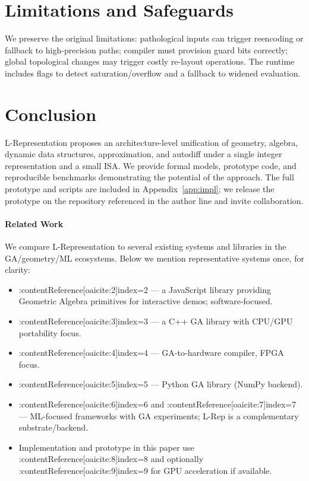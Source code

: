 \documentclass[11pt]{article}
\theoremstyle{definition}
\theoremstyle{plain}
\begin{document}
\section{Limitations and Safeguards}
We preserve the original limitations: pathological inputs can trigger reencoding or fallback to high-precision paths; compiler must provision guard bits correctly; global topological changes may trigger costly re-layout operations. The runtime includes flags to detect saturation/overflow and a fallback to widened evaluation.

\section{Conclusion}
L-Representation proposes an architecture-level unification of geometry, algebra, dynamic data structures, approximation, and autodiff under a single integer representation and a small ISA. We provide formal models, prototype code, and reproducible benchmarks demonstrating the potential of the approach. The full prototype and scripts are included in Appendix~\ref{app:impl}; we release the prototype on the repository referenced in the author line and invite collaboration.

\paragraph{Related Work}
We compare L-Representation to several existing systems and libraries in the GA/geometry/ML ecosystems. Below we mention representative systems once, for clarity:

\begin{itemize}
  \item :contentReference[oaicite:2]{index=2} — a JavaScript library providing Geometric Algebra primitives for interactive demos; software-focused.
  \item :contentReference[oaicite:3]{index=3} — a C++ GA library with CPU/GPU portability focus.
  \item :contentReference[oaicite:4]{index=4} — GA-to-hardware compiler, FPGA focus.
  \item :contentReference[oaicite:5]{index=5} — Python GA library (NumPy backend).
  \item :contentReference[oaicite:6]{index=6} and :contentReference[oaicite:7]{index=7} — ML-focused frameworks with GA experiments; L-Rep is a complementary substrate/backend.
  \item Implementation and prototype in this paper use :contentReference[oaicite:8]{index=8} and optionally :contentReference[oaicite:9]{index=9} for GPU acceleration if available.
\end{itemize}
\end{document}
